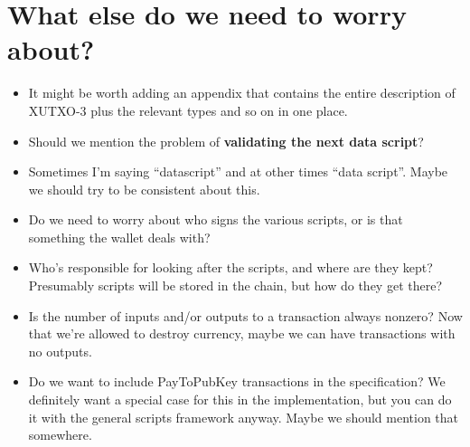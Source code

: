 \documentclass[a4paper]{article}
\newcommand{\s}{\textsf}  %
\theoremstyle{definition}  %
\begin{document}
\section{What else do we need to worry about?}
\begin{itemize}

\item It might be worth adding an appendix that contains the entire
  description of XUTXO-3 plus the relevant types and so on in one place.
  
\item Should we mention the problem of \textbf{validating the next data script}?

\item Sometimes I'm saying ``datascript'' and at other times ``data script''.
  Maybe we should try to be consistent about this.
  
\item Do we need to worry about who signs the various scripts, or is that
  something the wallet deals with?

\item Who's responsible for looking after the scripts, and where are they kept?
  Presumably scripts will be stored in the chain, but how do they get there?

\item Is the number of inputs and/or outputs to a transaction always nonzero?
  Now that we're allowed to destroy currency, maybe we can have transactions
  with no outputs.

\item Do we want to include \s{PayToPubKey} transactions in the
  specification?  We definitely want a special case for this in the
  implementation, but you can do it with the general scripts framework
  anyway. Maybe we should mention that somewhere.

\end{itemize}
  




\end{document}
